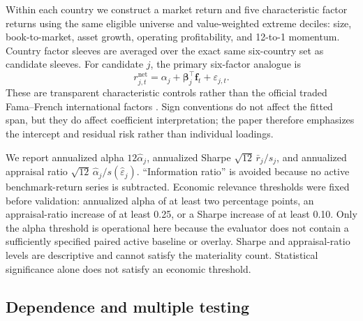 \documentclass[11pt]{article}
\begin{document}
Within each country we construct a market return and five characteristic factor returns using the same eligible universe and value-weighted extreme deciles: size, book-to-market, asset growth, operating profitability, and 12-to-1 momentum. Country factor sleeves are averaged over the exact same six-country set as candidate sleeves. For candidate $j$, the primary six-factor analogue is
\begin{equation}\label{eq:factor-model}
 r^{\mathrm{net}}_{j,t}=\alpha_j+\boldsymbol{\beta}_j^{\top}\mathbf{f}_t+\varepsilon_{j,t}.
\end{equation}
These are transparent characteristic controls rather than the official traded Fama--French international factors \citep{FamaFrench2015,Carhart1997}. Sign conventions do not affect the fitted span, but they do affect coefficient interpretation; the paper therefore emphasizes the intercept and residual risk rather than individual loadings.

We report annualized alpha $12\widehat\alpha_j$, annualized Sharpe $\sqrt{12}\,\bar r_j/s_j$, and annualized appraisal ratio $\sqrt{12}\,\widehat\alpha_j/s(\widehat\varepsilon_j)$. ``Information ratio'' is avoided because no active benchmark-return series is subtracted. Economic relevance thresholds were fixed before validation: annualized alpha of at least two percentage points, an appraisal-ratio increase of at least 0.25, or a Sharpe increase of at least 0.10. Only the alpha threshold is operational here because the evaluator does not contain a sufficiently specified paired active baseline or overlay. Sharpe and appraisal-ratio levels are descriptive and cannot satisfy the materiality count. Statistical significance alone does not satisfy an economic threshold.

\subsection{Dependence and multiple testing}
\end{document}
